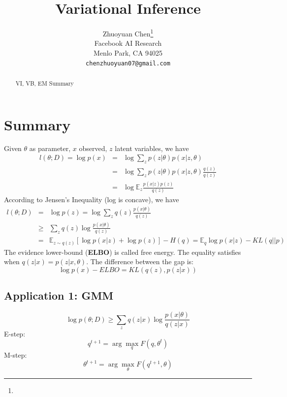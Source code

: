 \documentclass{article}
\title{Variational Inference}
\author{%
  Zhuoyuan Chen\thanks{}\\%
  Facebook AI Research\\
  Menlo Park, CA 94025 \\
  \texttt{chenzhuoyuan07@gmail.com} \\
}
\begin{document}

\maketitle

\begin{abstract}
VI, VB, EM Summary
\end{abstract}

\section{Summary}
Given $\theta$ as parameter, $x$ observed, $z$ latent variables, we have
\begin{eqnarray}
l(\theta; D) = \log p(x)&=& \log\sum_z p(z|\theta) p(x|z, \theta)\\
&=&  \log\sum_z p(z|\theta) p(x|z, \theta)\frac{q(z)}{q(z)}\\
&=&\log\mathbb{E}_z\frac{p(x|z)p(z)}{q(z)}
\end{eqnarray}
According to Jensen's Inequality (log is concave), we have
\begin{eqnarray}
l(\theta; D) &=&\log p(z) =\log\sum_z q(z) \frac{p(x|\theta)}{q(z)}\\
&\ge& \sum_z q(z)  \log\frac{p(x|\theta)}{q(z)}\\
&=& \mathbb{E}_{z\sim q(z)} [\log p(x|z)+\log p(z)]-H(q)=\mathbb{E}_q\log p(x|z) - KL(q||p)
\end{eqnarray}
The evidence lower-bound (\textbf{ELBO}) is called free energy. The equality satisfies when $q(z|x) = p(z|x,\theta)$.  The difference between the gap is:
\begin{equation}
\log p(x) - ELBO = KL(q(z), p(z|x))
\end{equation}

\subsection{Application 1: GMM}
\begin{equation}
\log p(\theta; D)\ge \sum_z q(z|x)  \log\frac{p(x|\theta)}{q(z|x)}
\end{equation}
E-step:
\begin{equation}
q^{t+1} = \arg\max_q F(q, \theta^t)
\end{equation}
M-step:
\begin{equation}
\theta^{t+1} = \arg\max_{\theta} F(q^{t+1}, \theta)
\end{equation}
\end{document}
